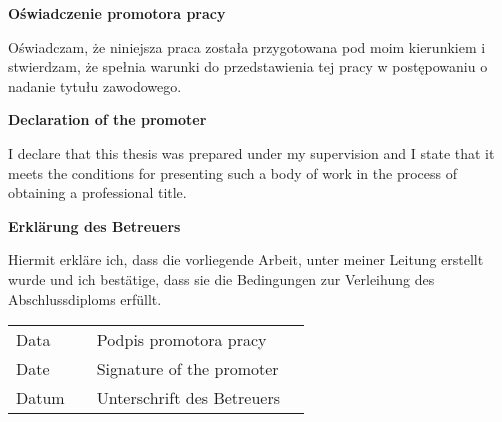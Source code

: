 \thispagestyle{empty}

\begin{singlespace}
	\begin{po}
		\begin{center}
			\textbf{Oświadczenie promotora pracy}
		\end{center}
		Oświadczam, że niniejsza praca została przygotowana pod moim kierunkiem i stwierdzam, że spełnia warunki do przedstawienia tej pracy w postępowaniu o nadanie tytułu zawodowego.
	\end{po}
	\begin{center}
		\textbf{Declaration of the promoter}
	\end{center}
	I declare that this thesis was prepared under my supervision and I state that it meets the conditions for presenting such a body of work in the process of obtaining a professional title.
	\begin{de}
		\begin{center}
			\textbf{Erklärung des Betreuers}
		\end{center}
		Hiermit erkläre ich, dass die vorliegende Arbeit, unter meiner Leitung erstellt wurde und ich bestätige, dass sie die Bedingungen zur Verleihung des Abschlussdiploms erfüllt.
	\end{de}

	\vspace{2cm}

	\begin{tabular}{llll}
		Data & \makebox[3.9cm]{\dotfill} & Podpis promotora pracy & \makebox[3.9cm]{\dotfill}\\
		Date & & Signature of the promoter & \\
		Datum & & Unterschrift des Betreuers & \\
	\end{tabular}
\end{singlespace}